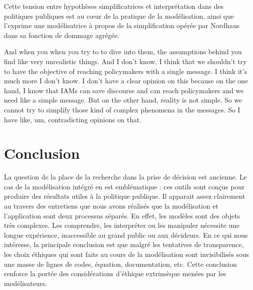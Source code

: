 Cette tension entre hypothèses simplificatrices et interprétation dans des politiques publiques est au cœur de la pratique de la modélisation, ainsi que l'exprime une modélisatrice à propos de la simplification opérée par Nordhaus dans sa fonction de dommage agrégée.

\begin{authoredquote}
    And when you when you try to to dive into them, the assumptions behind you find like very unrealistic things. And I don't know, I think that we shouldn't try to have the objective of reaching policymakers with a single message. I think it's much more  I don't know. I don't have a clear opinion on this because on the one hand, I know that  IAMs can save discourse and can reach policymakers and we need like a simple message. But on the other hand, reality is not simple. So we cannot try to simplify those kind of complex phenomena in the messages. So I have like, um, contradicting opinions on that.
\end{authoredquote}

\section{Conclusion}

La question de la place de la  recherche dans la prise de décision est ancienne. Le cas de la modélisation intégré en est emblématique : ces outils sont conçus pour produire des résultats utiles à la politique publique. Il apparait assez clairement au travers des entretiens que nous avons réalisés que la modélisation et l'application sont deux processus séparés. En effet, les modèles sont des objets très complexes. Les comprendre, les interpréter ou les manipuler nécessite une longue expérience, inaccessible au grand public ou aux décideurs. En ce qui nous intéresse, la principale conclusion est que malgré les tentatives de transparence, les choix éthiques qui sont faits au cours de la modélisation sont invisibilisés sous une masse de lignes de codes, équation, documentation, etc. Cette conclusion renforce la portée des considérations d'éthique extrinsèque menées par les modélisateurs. 








